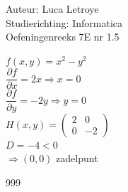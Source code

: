 \documentclass[a4paper]{article}
\begin{document}
  
\noindent \large Auteur: Luca Letroye \\
\noindent \large Studierichting: Informatica\\
\noindent \large Oefeningenreeks 7E nr 1.5\\

\medskip

\normalsize

$f(x,y) = x^2-y^2$\\

$\dfrac{\partial f}{\partial x} = 2x \Rightarrow x=0$\\

$\dfrac{\partial f}{\partial y} = -2y \Rightarrow y=0$\\

$H(x,y) = \left(\begin{array}{cc}
	2 & 0 \\
	0 & -2 
\end{array}\right)$\\

$D = -4 < 0 $\\

$\Rightarrow (0,0) $ zadelpunt\\


\begin{thebibliography}{999}
\end{thebibliography}
\end{document}

